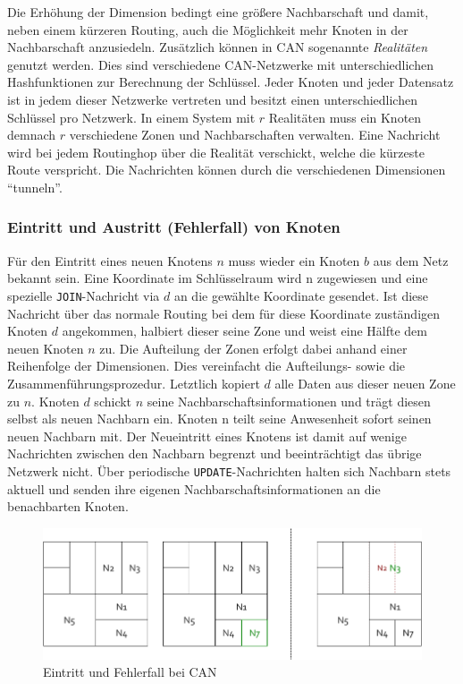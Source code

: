 Die Erhöhung der Dimension bedingt eine größere Nachbarschaft und damit, neben einem kürzeren Routing, auch die Möglichkeit mehr Knoten in der Nachbarschaft anzusiedeln. Zusätzlich können in CAN sogenannte \emph{Realitäten} genutzt werden. Dies sind verschiedene CAN-Netzwerke mit unterschiedlichen Hashfunktionen zur Berechnung der Schlüssel. Jeder Knoten und jeder Datensatz ist in jedem dieser Netzwerke vertreten und besitzt einen unterschiedlichen Schlüssel pro Netzwerk. In einem System mit $r$ Realitäten muss ein Knoten demnach $r$ verschiedene Zonen und Nachbarschaften verwalten. Eine Nachricht wird bei jedem Routinghop über die Realität verschickt, welche die kürzeste Route verspricht. Die Nachrichten können durch die verschiedenen Dimensionen \enquote{tunneln}.

\subsubsection{Eintritt und Austritt (Fehlerfall) von Knoten}
Für den Eintritt eines neuen Knotens $n$ muss wieder ein Knoten $b$ aus dem Netz bekannt sein. Eine Koordinate im Schlüsselraum wird n zugewiesen und eine spezielle \texttt{JOIN}-Nachricht via $d$ an die gewählte Koordinate gesendet. Ist diese Nachricht über das normale Routing bei dem für diese Koordinate zuständigen Knoten $d$ angekommen, halbiert dieser seine Zone und weist eine Hälfte dem neuen Knoten $n$ zu. Die Aufteilung der Zonen erfolgt dabei anhand einer Reihenfolge der Dimensionen. Dies vereinfacht die Aufteilungs- sowie die Zusammenführungsprozedur. Letztlich kopiert $d$ alle Daten aus dieser neuen Zone zu $n$. Knoten $d$ schickt $n$ seine Nachbarschaftsinformationen und trägt diesen selbst als neuen Nachbarn ein. Knoten n teilt seine Anwesenheit sofort seinen neuen Nachbarn mit. Der Neueintritt eines Knotens ist damit auf wenige Nachrichten zwischen den Nachbarn begrenzt und beeinträchtigt das übrige Netzwerk nicht. Über periodische \texttt{UPDATE}-Nachrichten halten sich Nachbarn stets aktuell und senden ihre eigenen Nachbarschaftsinformationen an die benachbarten Knoten.

\begin{figure}[htbp]
\centering
\includegraphics{grafics/can_new_node.pdf}
\caption{Eintritt und Fehlerfall bei CAN}
\label{fig:can_new_node}
\end{figure}

